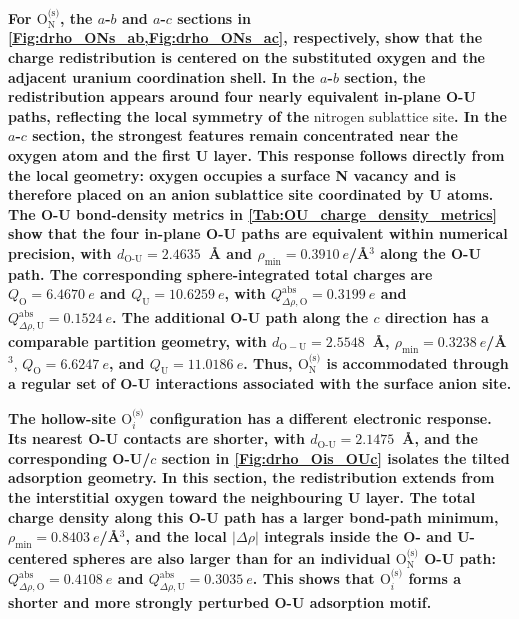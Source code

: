 \documentclass[preprint,12pt,sort&compress]{elsarticle}
\newcommand{\?}{\stackrel{?}{=}}
\providecommand{\DIFaddtex}[1]{{\bf #1}} %
\providecommand{\DIFdeltex}[1]{} %
\providecommand{\DIFaddbegin}{\protect\color{blue}} %
\providecommand{\DIFaddend}{\protect\color{black}} %
\providecommand{\DIFdelbegin}{\protect\color{red}} %
\providecommand{\DIFdelend}{\protect\color{black}} %
\providecommand{\DIFadd}[1]{\texorpdfstring{\DIFaddtex{#1}}{#1}} %
\providecommand{\DIFdel}[1]{\texorpdfstring{\DIFdeltex{#1}}{}} %
\begin{document}
\DIFadd{For $\mathrm{O}_{\mathrm{N}}^{\text{(s)}}$, the $a$-$b$ and $a$-$c$ sections in \cref{Fig:drho_ONs_ab,Fig:drho_ONs_ac}, respectively, show that the charge redistribution is centered on the substituted oxygen and the adjacent uranium coordination shell. In the $a$-$b$ section, the redistribution appears around four nearly equivalent in-plane O-U paths, reflecting the local symmetry of the }\DIFaddend nitrogen sublattice site\DIFdelbegin \DIFdel{is coordinated entirely by uranium atoms. Projected density of states (DOS) calculations~\cite{Bocharov2011JNM,Zhukovskii2009JNM} show that oxygen at such a site on the surface has its $2p$ states partly mixed with U~$5f$ states, while the N~$2p$ band position remains insensitive to the presence of oxygen . This indicates that the relevant bonding interaction is between oxygen and its nearest-neighbor uranium atoms rather than with nitrogen}\DIFdelend \DIFaddbegin \DIFadd{. In the $a$-$c$ section, the strongest features remain concentrated near the oxygen atom and the first U layer. This response follows directly from the local geometry: oxygen occupies a surface N vacancy and is therefore placed on an anion sublattice site coordinated by U atoms. The O-U bond-density metrics in \cref{Tab:OU_charge_density_metrics} show that the four in-plane O-U paths are equivalent within numerical precision, with $d_{\text{O-U}}=2.4635$~\AA{} and $\rho_\mathrm{min}=0.3910~e$/\AA{}$^{3}$ along the O-U path. The corresponding sphere-integrated total charges are $Q_\mathrm{O}=6.4670~e$ and $Q_\mathrm{U}=10.6259~e$, with $Q^\mathrm{abs}_{\Delta\rho,\mathrm{O}}=0.3199~e$ and $Q^\mathrm{abs}_{\Delta\rho,\mathrm{U}}=0.1524~e$. The additional O-U path along the $c$ direction has a comparable partition geometry, with $d_{\mathrm{O-U}}=2.5548$~\AA{}, $\rho_\mathrm{min}=0.3238~e$/\AA{}$^{3}$}\DIFaddend , \DIFaddbegin \DIFadd{$Q_\mathrm{O}=6.6247~e$, and $Q_\mathrm{U}=11.0186~e$. Thus, $\mathrm{O}_{\mathrm{N}}^{\text{(s)}}$ is accommodated through a regular set of O-U interactions associated with the surface anion site.
}

\DIFadd{The hollow-site $\mathrm{O}_i^{\text{(s)}}$ configuration has a different electronic response. Its nearest O-U contacts are shorter, with $d_{\text{O-U}}=2.1475$~\AA{}, and the corresponding O-U/$c$ section in \cref{Fig:drho_Ois_OUc} isolates the tilted adsorption geometry. In this section, the redistribution extends from the interstitial oxygen toward the neighbouring U layer. The total charge density along this O-U path has a larger bond-path minimum, $\rho_\mathrm{min}=0.8403~e$/\AA{}$^{3}$, and the local $|\Delta\rho|$ integrals inside the O- and U-centered spheres are also larger than for an individual $\mathrm{O}_{\mathrm{N}}^{\text{(s)}}$ O-U path: $Q^\mathrm{abs}_{\Delta\rho,\mathrm{O}}=0.4108~e$ and $Q^\mathrm{abs}_{\Delta\rho,\mathrm{U}}=0.3035~e$. This shows that $\mathrm{O}_i^{\text{(s)}}$ forms a shorter and more strongly perturbed O-U adsorption motif.
}
\end{document}

